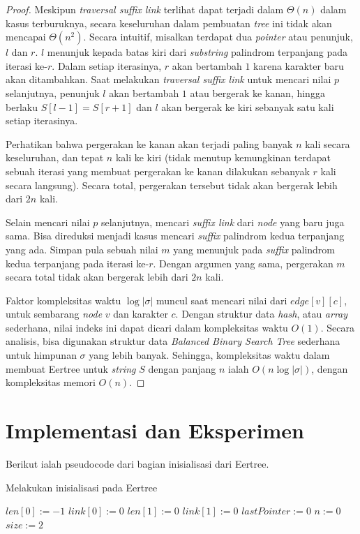 \documentclass[11pt, a4paper, final]{article}
\begin{document}
\begin{proof}
Meskipun \textit{traversal suffix link} terlihat dapat terjadi dalam $\Theta(n)$ dalam kasus terburuknya, secara keseluruhan dalam pembuatan \textit{tree} ini tidak akan mencapai $\Theta(n^2)$. Secara intuitif, misalkan terdapat dua \textit{pointer} atau penunjuk, $l$ dan $r$. $l$ menunjuk kepada batas kiri dari \textit{substring} palindrom terpanjang pada iterasi ke-$r$. Dalam setiap iterasinya, $r$ akan bertambah $1$ karena karakter baru akan ditambahkan. Saat melakukan \textit{traversal suffix link} untuk mencari nilai $p$ selanjutnya, penunjuk $l$ akan bertambah $1$ atau bergerak ke kanan, hingga berlaku $S[l - 1] = S[r + 1]$ dan $l$ akan bergerak ke kiri sebanyak satu kali setiap iterasinya. 

Perhatikan bahwa pergerakan ke kanan akan terjadi paling banyak $n$ kali secara keseluruhan, dan tepat $n$ kali ke kiri (tidak menutup kemungkinan terdapat sebuah iterasi yang membuat pergerakan ke kanan dilakukan sebanyak $r$ kali secara langsung). Secara total, pergerakan tersebut tidak akan bergerak lebih dari $2n$ kali. 

Selain mencari nilai $p$ selanjutnya, mencari \textit{suffix link} dari \textit{node} yang baru juga sama. Bisa direduksi menjadi kasus mencari \textit{suffix} palindrom kedua terpanjang yang ada. Simpan pula sebuah nilai $m$ yang menunjuk pada \textit{suffix} palindrom kedua terpanjang pada iterasi ke-$r$. Dengan argumen yang sama, pergerakan $m$ secara total tidak akan bergerak lebih dari $2n$ kali.

Faktor kompleksitas waktu $\log |\sigma|$ muncul saat mencari nilai dari $edge[v][c]$, untuk sembarang \textit{node} $v$ dan karakter $c$. Dengan struktur data \textit{hash}, atau \textit{array} sederhana, nilai indeks ini dapat dicari dalam kompleksitas waktu $O(1)$. Secara analisis, bisa digunakan struktur data \textit{Balanced Binary Search Tree} sederhana untuk himpunan $\sigma$ yang lebih banyak. Sehingga, kompleksitas waktu dalam membuat Eertree untuk \textit{string} $S$ dengan panjang $n$ ialah $O(n \log |\sigma|)$, dengan kompleksitas memori $O(n)$.
\end{proof}

\section{Implementasi dan Eksperimen}

Berikut ialah pseudocode dari bagian inisialisasi dari Eertree.

\begin{algorithm}
\DontPrintSemicolon
\caption{Melakukan inisialisasi pada Eertree}\label{alg:init}
$len[0] := -1$
$link[0] := 0$\;
$len[1] := 0$\;
$link[1] := 0$\;
$lastPointer := 0$
$n := 0$
$size := 2$
\end{algorithm}
\end{document}
